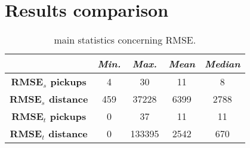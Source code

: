\section{Results comparison}
\begin{table}[h!]
	\centering
	\renewcommand\arraystretch{1.3}
	\begin{tabular}{c|c|c|c|c|}
		\hline
		\textit{} & \textit{Min.} & \textit{Max.} & \textit{Mean} & \textit{Median} \\
		\hline
		\textbf{RMSE$_s$ pickups} & 4 & 30 & 11 & 8 \\
		\hline
		\textbf{RMSE$_s$ distance} & 459 & 37228 & 6399 & 2788 \\
		\hline
		\textbf{RMSE$_t$ pickups} & 0 & 37 & 11 & 11 \\
		\hline
		\textbf{RMSE$_t$ distance} & 0 & 133395 & 2542 & 670\\
		\hline
	\end{tabular}
	\caption[Main statistics concerning RMSE (HDGM)]{main statistics concerning RMSE.}
	\label{RMSE_HDGM_stats}
\end{table}